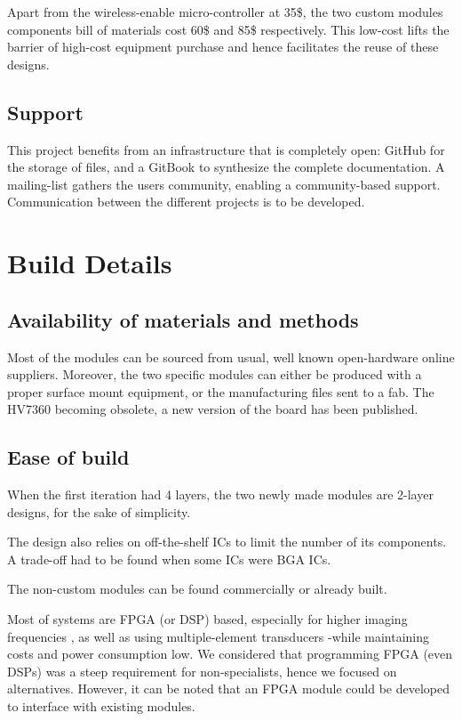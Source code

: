 \documentclass[letterpaper, 10 pt, conference]{ieeeconf} %
\begin{document}
Apart from the wireless-enable micro-controller at 35\$, the two custom modules components bill of materials cost 60\$ and 85\$ respectively. This low-cost lifts the barrier of high-cost equipment purchase and hence facilitates the reuse of these designs.

\subsection{Support} 

This project benefits from an infrastructure that is completely open: GitHub for the storage of files, and a GitBook to synthesize the complete documentation. A mailing-list gathers the users community, enabling a community-based support. Communication between the different projects is to be developed. 

\section{Build Details}

\subsection{Availability of materials and methods}

Most of the modules can be sourced from usual, well known open-hardware online suppliers. Moreover, the two specific modules can either be produced with a proper surface mount equipment, or the manufacturing files sent to a fab. The HV7360 becoming obsolete, a new version of the board has been published.

\subsection{ Ease of build}

When the first iteration had 4 layers, the two newly made modules are 2-layer designs, for the sake of simplicity.

The design also relies on off-the-shelf ICs to limit the number of its components. A trade-off had to be found when some ICs were BGA ICs.

The non-custom modules can be found commercially or already built.

Most of systems are FPGA (or DSP) based, especially for higher imaging frequencies \cite{c4,c5}, as well as using multiple-element transducers \cite{c7} -while maintaining costs and power consumption low. We considered that programming FPGA (even DSPs) was a steep requirement for non-specialists, hence we focused on alternatives. However, it can be noted that an FPGA module could be developed to interface with existing modules. 
\end{document}
